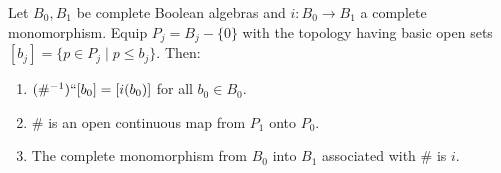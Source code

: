 Let $B_0, B_1$ be complete Boolean algebras and $i: B_0 \rightarrow B_1$ a complete monomorphism. Equip $P_j = B_j - \{0\}$ with the topology having basic open sets $[b_j] = \{p \in P_j \mid p \leq b_j\}$. Then:

\begin{enumerate}
\item $(\#^{-1})``[b_0] = [i(b_0)]$ for all $b_0 \in B_0$.
\item $\#$ is an open continuous map from $P_1$ onto $P_0$.
\item The complete monomorphism from $B_0$ into $B_1$ associated with $\#$ is $i$.
\end{enumerate}
